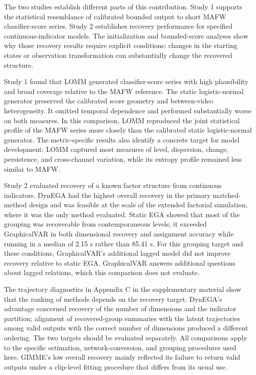 \documentclass[
]{article}
\begin{document}
The two studies establish different parts of this contribution. Study 1
supports the statistical resemblance of calibrated bounded output to
short MAFW classifier-score series. Study 2 establishes recovery
performance for specified continuous-indicator models. The
initialization and bounded-score analyses show why those recovery
results require explicit conditions: changes in the starting states or
observation transformation can substantially change the recovered
structure.

Study 1 found that LOMM generated classifier-score series with high
plausibility and broad coverage relative to the MAFW reference. The
static logistic-normal generator preserved the calibrated score geometry
and between-video heterogeneity. It omitted temporal dependence and
performed substantially worse on both measures. In this comparison, LOMM
reproduced the joint statistical profile of the MAFW series more closely
than the calibrated static logistic-normal generator. The
metric-specific results also identify a concrete target for model
development: LOMM captured most measures of level, dispersion, change,
persistence, and cross-channel variation, while its entropy profile
remained less similar to MAFW.

Study 2 evaluated recovery of a known factor structure from continuous
indicators. DynEGA had the highest overall recovery in the primary
matched-method design and was feasible at the scale of the extended
factorial simulation, where it was the only method evaluated. Static EGA
showed that most of the grouping was recoverable from contemporaneous
levels; it exceeded GraphicalVAR in both dimensional recovery and
assignment accuracy while running in a median of 2.15 s rather than
85.41 s. For this grouping target and these conditions, GraphicalVAR's
additional lagged model did not improve recovery relative to static EGA.
GraphicalVAR answers additional questions about lagged relations, which
this comparison does not evaluate.

The trajectory diagnostics in Appendix C in the supplementary material
show that the ranking of methods depends on the recovery target.
DynEGA's advantage concerned recovery of the number of dimensions and
the indicator partition; alignment of recovered-group summaries with the
latent trajectories among valid outputs with the correct number of
dimensions produced a different ordering. The two targets should be
evaluated separately. All comparisons apply to the specific estimation,
network-conversion, and grouping procedures used here. GIMME's low
overall recovery mainly reflected its failure to return valid outputs
under a clip-level fitting procedure that differs from its usual use.
\end{document}
